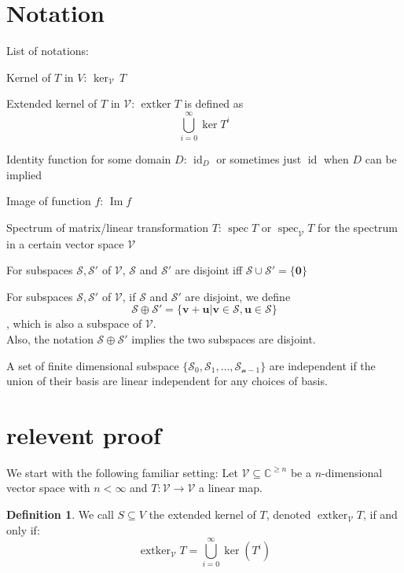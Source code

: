 \documentclass{article}
\theoremstyle{plain}
\theoremstyle{definition}
\newtheorem{definition}[theorem]{Definition}
\newcommand{\0}{\mathbf{0}}
\renewcommand{\vec}{\mathbf}
\newcommand{\C}{\mathbb{C}}
\newcommand{\vecspace}[1]{\mathcal{#1}}
\DeclareMathOperator{\extker}{extker}
\DeclareMathOperator{\id}{id}
\DeclareMathOperator{\img}{Im}
\DeclareMathOperator{\spec}{spec}
\begin{document}
\section*{Notation}
List of notations:

Kernel of $T$ in $V$: $\ker_\vecspace{V}\,T$

Extended kernel of $T$ in $\vecspace{V}$: $\extker T$ is defined as
\begin{equation*}
    \bigcup_{i=0}^{\infty}\ker T^i
\end{equation*}

Identity function for some domain $D$: $\id_D$ or sometimes just $\id$ when $D$ can be implied

Image of function $f$: $\img f$

Spectrum of matrix/linear transformation $T$: $\spec T$ or $\spec_\vecspace{V} T$ for the spectrum in a certain vector space $\vecspace{V}$

For subspaces $\vecspace{S}, \vecspace{S}'$ of $\vecspace{V}$, $\vecspace{S}$ and $\vecspace{S}'$ are disjoint iff $\vecspace{S} \cup \vecspace{S}' = \{\0\}$

For subspaces $\vecspace{S}, \vecspace{S}'$ of $\vecspace{V}$, if $\vecspace{S}$ and $\vecspace{S}'$ are disjoint, we define
\begin{equation*}
    \vecspace{S} \oplus \vecspace{S}' = \{\vec{v}+\vec{u}|\vec{v}\in\vecspace{S},\vec{u}\in\vecspace{S}\}
\end{equation*}
, which is also a subspace of $\vecspace{V}$. \\
Also, the notation $\vecspace{S}\oplus\vecspace{S}'$ implies the two subspaces are disjoint.

A set of finite dimensional subspace $\{\vecspace{S_0}, \vecspace{S_1}, \dots, \vecspace{S_{n-1}}\}$ are independent if the union of their basis are linear independent for any choices of basis.

\section{relevent proof}
We start with the following familiar setting:
Let $\vecspace{V} \subseteq \C^{\geq n} $ be a $n$-dimensional vector space with $n < \infty$ and $T:\vecspace{V} \to \vecspace{V}$ a linear map.

\begin{definition}
    We call $S \subseteq V$ the extended kernel of $T$, denoted $\extker_\vecspace{V}{T}$, if and only if:
\begin{equation*}
    \extker_\vecspace{V}{T} = \bigcup_{i=0}^{\infty}\ker (T^i)
\end{equation*}
\end{definition}
\end{document}
